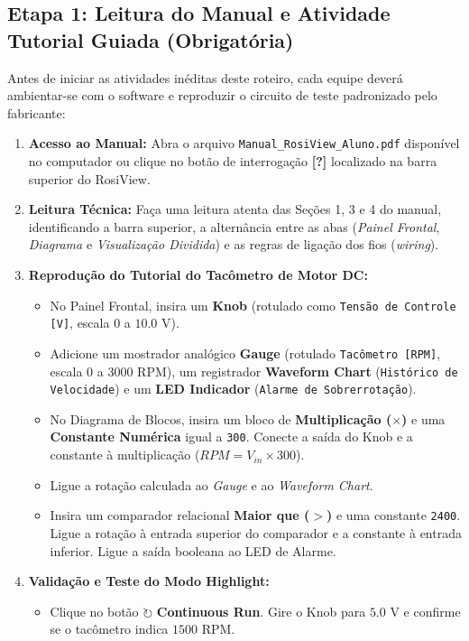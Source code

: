 \documentclass[11pt,a4paper]{article}
\begin{document}
\subsection{Etapa 1: Leitura do Manual e Atividade Tutorial Guiada (Obrigatória)}
Antes de iniciar as atividades inéditas deste roteiro, cada equipe deverá ambientar-se com o software e reproduzir o circuito de teste padronizado pelo fabricante:

\begin{enumerate}
    \item \textbf{Acesso ao Manual:} Abra o arquivo \texttt{Manual\_RosiView\_Aluno.pdf} disponível no computador ou clique no botão de interrogação \textbf{[?]} localizado na barra superior do RosiView.
    \item \textbf{Leitura Técnica:} Faça uma leitura atenta das Seções 1, 3 e 4 do manual, identificando a barra superior, a alternância entre as abas (\textit{Painel Frontal}, \textit{Diagrama} e \textit{Visualização Dividida}) e as regras de ligação dos fios (\textit{wiring}).
    \item \textbf{Reprodução do Tutorial do Tacômetro de Motor DC:}
    \begin{itemize}
        \item No Painel Frontal, insira um \textbf{Knob} (rotulado como \texttt{Tensão de Controle [V]}, escala $0$ a $10.0\text{ V}$).
        \item Adicione um mostrador analógico \textbf{Gauge} (rotulado \texttt{Tacômetro [RPM]}, escala $0$ a $3000\text{ RPM}$), um registrador \textbf{Waveform Chart} (\texttt{Histórico de Velocidade}) e um \textbf{LED Indicador} (\texttt{Alarme de Sobrerrotação}).
        \item No Diagrama de Blocos, insira um bloco de \textbf{Multiplicação ($\times$)} e uma \textbf{Constante Numérica} igual a \texttt{300}. Conecte a saída do Knob e a constante à multiplicação ($RPM = V_{in} \times 300$).
        \item Ligue a rotação calculada ao \textit{Gauge} e ao \textit{Waveform Chart}.
        \item Insira um comparador relacional \textbf{Maior que ($>$)} e uma constante \texttt{2400}. Ligue a rotação à entrada superior do comparador e a constante à entrada inferior. Ligue a saída booleana ao LED de Alarme.
    \end{itemize}
    \item \textbf{Validação e Teste do Modo Highlight:}
    \begin{itemize}
        \item Clique no botão $\circlearrowright$ \textbf{Continuous Run}. Gire o Knob para $5.0\text{ V}$ e confirme se o tacômetro indica $1500\text{ RPM}$.

\end{itemize}
\end{enumerate}
\end{document}
